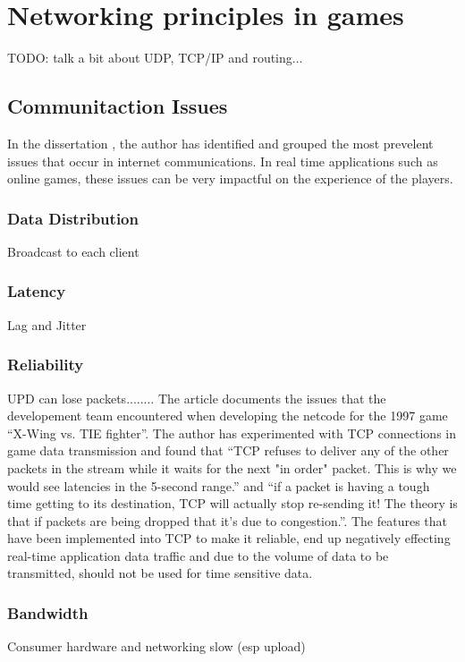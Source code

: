 \newpage
\section{Networking principles in games}
TODO: talk a bit about UDP, TCP/IP and routing...

\subsection{Communitaction Issues}

In the dissertation , the author has identified and grouped the most prevelent issues that occur in internet communications. In real time applications such as online games, these issues can be very impactful on the experience of the players.

\subsubsection{Data Distribution}
Broadcast to each client

\subsubsection{Latency}
Lag and Jitter


\subsubsection{Reliability}
UPD can lose packets........ The article  documents the issues that the developement team encountered when developing the netcode for the 1997 game ``X-Wing vs. TIE fighter''. The author has experimented with TCP connections in game data transmission and found that ``TCP refuses to deliver any of the other packets in the stream while it waits for the next "in order" packet. This is why we would see latencies in the 5-second range.'' and ``if a packet is having a tough time getting to its destination, TCP will actually stop re-sending it! The theory is that if packets are being dropped that it's due to congestion.''. The features that have been implemented into TCP to make it reliable, end up negatively effecting real-time application data traffic and due to the volume of data to be transmitted, should not be used for time sensitive data.

\subsubsection{Bandwidth}
Consumer hardware and networking slow (esp upload)

